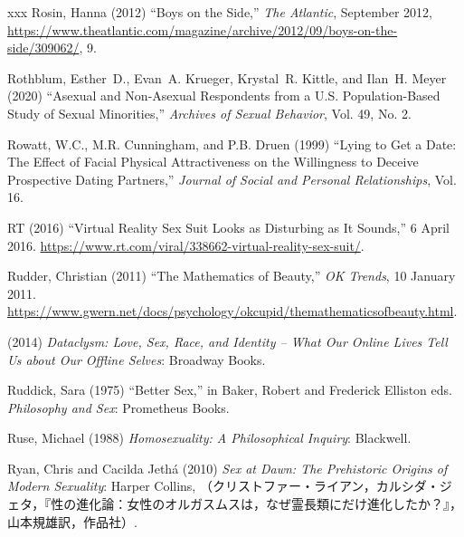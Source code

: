 \documentclass[]{jlreq} \usepackage{mystyle}
\begin{document}
\begin{thebibliography}{xxx}
Rosin, Hanna (2012) ``Boys on the Side,'' \emph{The Atlantic}, September 2012,
  \url{https://www.theatlantic.com/magazine/archive/2012/09/boys-on-the-side/309062/},
  9.

Rothblum, Esther~D., Evan~A. Krueger, Krystal~R. Kittle, and Ilan~H. Meyer
  (2020) ``Asexual and Non-Asexual Respondents from a U.S. Population-Based
  Study of Sexual Minorities,'' \textit{ Archives of Sexual Behavior}, Vol. 49,
  No. 2.

Rowatt, W.C., M.R. Cunningham, and P.B. Druen (1999) ``Lying to Get a Date: The
  Effect of Facial Physical Attractiveness on the Willingness to Deceive
  Prospective Dating Partners,'' \textit{ Journal of Social and Personal
  Relationships}, Vol. 16.

RT (2016) ``Virtual Reality Sex Suit Looks as Disturbing as It Sounds,'' 6
  April 2016. \url{https://www.rt.com/viral/338662-virtual-reality-sex-suit/}.

Rudder, Christian (2011) ``The Mathematics of Beauty,'' \emph{OK Trends}, 10
  January 2011.
  \url{https://www.gwern.net/docs/psychology/okcupid/themathematicsofbeauty.html}.

 \bysame{}  (2014)  \textit{ Dataclysm: Love, Sex, Race, and Identity -- What
  Our Online Lives Tell Us about Our Offline Selves}: Broadway Books.

Ruddick, Sara (1975) ``Better Sex,'' in Baker, Robert and Frederick Elliston
  eds.   \textit{ Philosophy and Sex}: Prometheus Books.

Ruse, Michael (1988)  \textit{ Homosexuality: A Philosophical Inquiry}:
  Blackwell.

Ryan, Chris and Cacilda Jethá (2010)  \textit{ Sex at Dawn: The Prehistoric
  Origins of Modern Sexuality}: Harper Collins,
  （クリストファー・ライアン，カルシダ・ジェタ，『性の進化論：女性のオルガスムスは，なぜ霊長類にだけ進化したか？』，山本規雄訳，作品社）.


\end{thebibliography}
\end{document}
